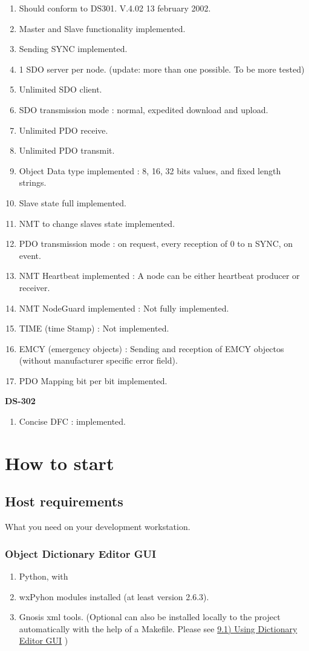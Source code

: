 \documentclass[a4paper,12pt]{book}
\newcommand\liststyleLiv{%
\renewcommand\labelitemi{{--}}
\renewcommand\labelitemii{{--}}
\renewcommand\labelitemiii{{--}}
\renewcommand\labelitemiv{{--}}
}
\newcommand\liststyleLv{%
\renewcommand\labelitemi{{--}}
\renewcommand\labelitemii{{--}}
\renewcommand\labelitemiii{{--}}
\renewcommand\labelitemiv{{--}}
}
\begin{document}
\liststyleLiv
\begin{enumerate}
\item Should conform to DS301. V.4.02 13 february 2002.
\item Master and Slave functionality implemented.
\item Sending SYNC implemented.
\item 1 SDO server per node. (update: more than one possible. To be more
tested)
\item Unlimited SDO client.
\item SDO transmission mode : normal, expedited download and upload.
\item Unlimited PDO receive.
\item Unlimited PDO transmit.
\item Object Data type implemented : 8, 16, 32 bits values, and fixed
length strings.
\item Slave state full implemented.
\item NMT to change slave{\textquotesingle}s state implemented.
\item PDO transmission mode : on request, every reception of 0 to n
SYNC, on event.
\item NMT Heartbeat implemented : A node can be either heartbeat
producer or receiver.
\item NMT NodeGuard implemented : Not fully implemented.
\item TIME (time Stamp) : Not implemented.
\item EMCY (emergency objects) : Sending and reception of EMCY objectos (without manufacturer specific error field).
\item PDO Mapping bit per bit implemented.
\end{enumerate}
{\bfseries\upshape
DS{}-302}

\liststyleLiv
\begin{enumerate}
\item Concise \space DFC : implemented.
\end{enumerate}
\section{How to start}
\subsection{Host requirements}
What you need on your development workstation.

\subsubsection{Object Dictionary Editor GUI}
\liststyleLv
\begin{enumerate}
\item Python, with 
\item wxPyhon modules installed (at least version 2.6.3). 
\item Gnosis xml tools. (Optional can also be installed locally to the
project automatically with the help of a Makefile. Please see
\hyperlink{a91UsingDictionaryEditorGUIoutline}{9.1) Using Dictionary
Editor GUI} )
\end{enumerate}
\end{document}
